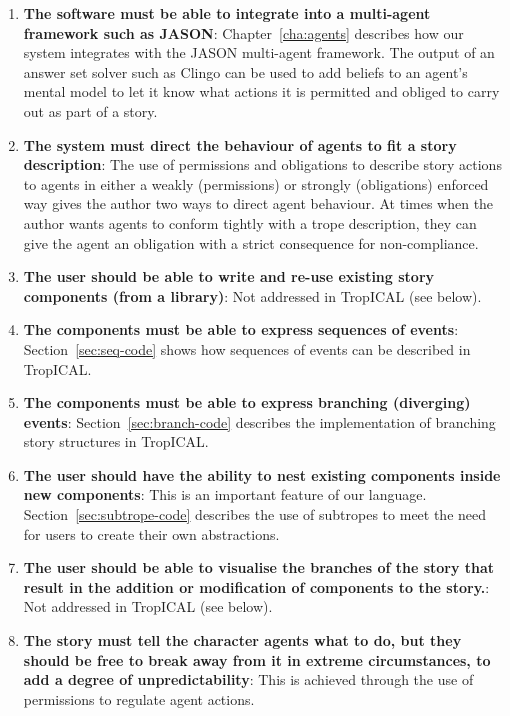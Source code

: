 \documentclass[11pt]{report}
\begin{document}
\begin{enumerate}[R1.]
  \item \textbf{The software must be able to integrate into a
    multi-agent framework such as JASON}: Chapter~\ref{cha:agents} describes how our system integrates with the JASON
multi-agent framework. The output of an answer set solver such as Clingo can be
used to add beliefs to an agent's mental model to let it know what actions it is
permitted and obliged to carry out as part of a story.
  \item \textbf{The system must direct the behaviour of agents to fit
    a story description}: 
The use of permissions and obligations to describe story actions to agents in
either a weakly (permissions) or strongly (obligations) enforced way gives the
author two ways to direct agent behaviour. At times when the author wants agents
to conform tightly with a trope description, they can give the agent an
obligation with a strict consequence for non-compliance.
  \item \textbf{The user should be able to write and re-use
    existing story components (from a library)}: Not addressed in TropICAL (see below).
  \item \textbf{The components must be able to express sequences of events}: Section~\ref{sec:seq-code} shows how sequences of events can be described in
TropICAL.
  \item \textbf{The components must be able to express branching
    (diverging) events}: Section~\ref{sec:branch-code} describes the
  implementation of branching story structures in TropICAL.
  \item \textbf{The user should have the ability to nest existing
    components inside new components}: This is an important feature of our
  language. Section~\ref{sec:subtrope-code} describes the
use of subtropes to meet the need for users to create their own abstractions.
  \item \textbf{The user should be able to visualise the branches of the
    story that result in the addition or modification of components to the
    story.}: Not addressed in TropICAL (see below).
  \item \textbf{The story must tell the character agents what to do, but
    they should be free to break away from it in extreme circumstances, to add a
    degree of unpredictability}: This is achieved
through the use of permissions to regulate agent actions.
\end{enumerate}
\end{document}
